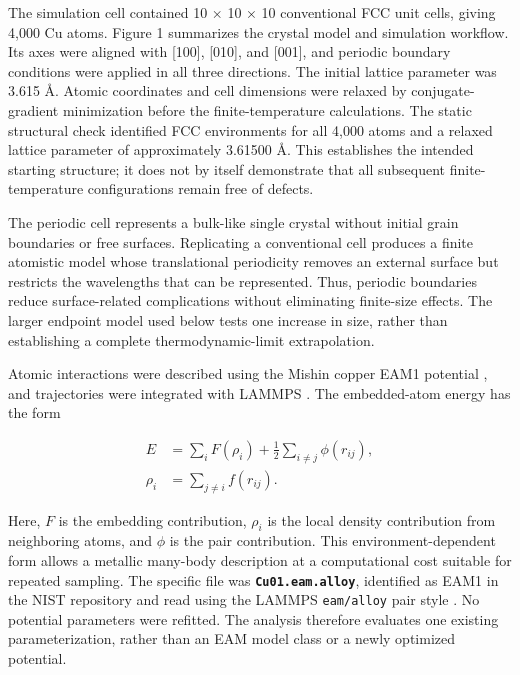 \documentclass[10pt,a4paper,twocolumn]{article}
\begin{document}
The simulation cell contained 10 × 10 × 10 conventional FCC unit cells, giving 4,000 Cu atoms. Figure 1 summarizes the crystal model and simulation workflow. Its axes were aligned with [100], [010], and [001], and periodic boundary conditions were applied in all three directions. The initial lattice parameter was 3.615 Å. Atomic coordinates and cell dimensions were relaxed by conjugate-gradient minimization before the finite-temperature calculations. The static structural check identified FCC environments for all 4,000 atoms and a relaxed lattice parameter of approximately 3.61500 Å. This establishes the intended starting structure; it does not by itself demonstrate that all subsequent finite-temperature configurations remain free of defects.


The periodic cell represents a bulk-like single crystal without initial grain boundaries or free surfaces. Replicating a conventional cell produces a finite atomistic model whose translational periodicity removes an external surface but restricts the wavelengths that can be represented. Thus, periodic boundaries reduce surface-related complications without eliminating finite-size effects. The larger endpoint model used below tests one increase in size, rather than establishing a complete thermodynamic-limit extrapolation.


Atomic interactions were described using the Mishin copper EAM1 potential \cite{r5}, and trajectories were integrated with LAMMPS \cite{r7}. The embedded-atom energy has the form


\begin{equation}
\begin{aligned}
E&=\sum_i F(\rho_i)+\frac{1}{2}\sum_{i\ne j}\phi(r_{ij}),\\
\rho_i&=\sum_{j\ne i}f(r_{ij}).
\end{aligned}\tag{1}
\end{equation}

Here, $F$ is the embedding contribution, $\rho_i$ is the local density contribution from neighboring atoms, and $\phi$ is the pair contribution. This environment-dependent form allows a metallic many-body description at a computational cost suitable for repeated sampling. The specific file was \textbf{\texttt{Cu01.eam.alloy}}, identified as EAM1 in the NIST repository and read using the LAMMPS \texttt{eam/alloy} pair style \cite{r6}. No potential parameters were refitted. The analysis therefore evaluates one existing parameterization, rather than an EAM model class or a newly optimized potential.
\end{document}
